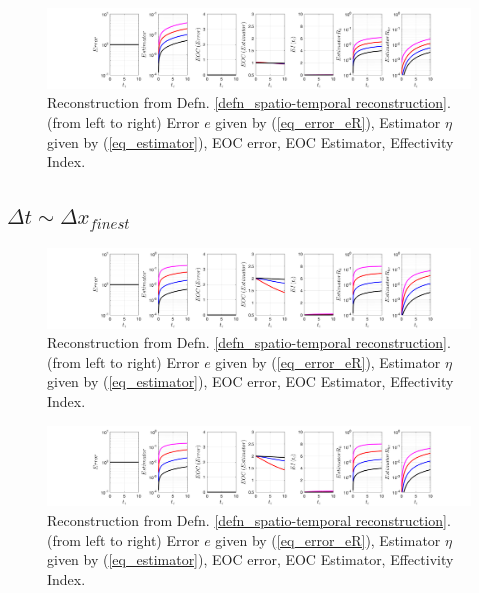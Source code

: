 \documentclass[12pt,a4paper]{article}
\numberwithin{equation}{section}
\theoremstyle{definition}
\begin{document}
\begin{figure}[H]
	\hspace{-3cm}
	\includegraphics[scale=0.55]{../figures/fig_SHW_RK3_LXF_rec3_pow_oneplots_1x5_shw_periodic}	
	\caption{Reconstruction from Defn. \ref{defn_spatio-temporal reconstruction}. (from left to right) Error $e$ given by (\ref{eq_error_eR}), Estimator $\eta$ given by (\ref{eq_estimator}), EOC error, EOC Estimator, Effectivity Index.}
	\label{fig_all_RK3_LXF_rec3_pow_one}
\end{figure}



\subsection*{$\Delta t \sim \Delta x_{finest}$}
\begin{figure}[H]
	\hspace{-3cm}
	\includegraphics[scale=0.55]{../figures/fig_SHW_RK1_LXF_rec1_fixedplots_1x5_shw_periodic}	
	\caption{Reconstruction from Defn. \ref{defn_spatio-temporal reconstruction}. (from left to right) Error $e$ given by (\ref{eq_error_eR}), Estimator $\eta$ given by (\ref{eq_estimator}), EOC error, EOC Estimator, Effectivity Index.}
	\label{fig_all_RK1_LXF_rec1_fixed}
\end{figure}

\begin{figure}[H]
	\hspace{-3cm}
	\includegraphics[scale=0.55]{../figures/fig_SHW_RK3_LXF_rec3_fixedplots_1x5_shw_periodic}	
	\caption{Reconstruction from Defn. \ref{defn_spatio-temporal reconstruction}. (from left to right) Error $e$ given by (\ref{eq_error_eR}), Estimator $\eta$ given by (\ref{eq_estimator}), EOC error, EOC Estimator, Effectivity Index.}
	\label{fig_all_RK3_LXF_rec3_fixed}
\end{figure}
\end{document}
